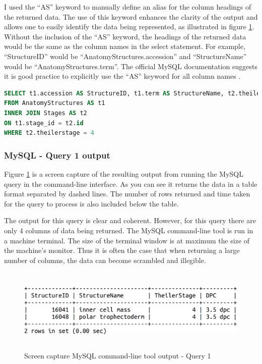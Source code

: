 I used the ``AS'' keyword to manually define an alias for the column headings of the returned data. The use of this keyword enhances the clarity of the output and allows one to easily identify the data being represented, as illustrated in figure \ref{fig:mysqlquery1}. Without the inclusion of the ``AS'' keyword, the headings of the returned data would be the same as the column names in the select statement. For example, ``StructureID'' would be ``AnatomyStructures.accession'' and ``StructureName'' would be ``AnatomyStructures.term''. The official MySQL documentation suggests it is good practice to explicitly use the ``AS'' keyword for all column names \cite{mysqlworkbench}.

\begin{lstlisting}[language=SQL, caption=MySQL query 1 statement. All structures at Theiler Stage X., label=code:mysqlquery1]
SELECT t1.accession AS StructureID, t1.term AS StructureName, t2.theilerstage AS TheilerStage, t2.dpc AS DPC
FROM AnatomyStructures AS t1
INNER JOIN Stages AS t2
ON t1.stage_id = t2.id
WHERE t2.theilerstage = 4
\end{lstlisting}

\subsubsection*{MySQL - Query 1 output}\label{mysqlquery1output}
Figure \ref{fig:mysqlquery1} is a screen capture of the resulting output from running the MySQL query in the command-line interface. As you can see it returns the data in a table format separated by dashed lines. The number of rows returned and time taken for the query to process is also included below the table.

The output for this query is clear and coherent. However, for this query there are only 4 columns of data being returned. The MySQL command-line tool is run in a machine terminal. The size of the terminal window is at maximum the size of the machine's monitor. Thus it is often the case that when returning a large number of columns, the data can become scrambled and illegible.

\begin{figure}[H]\begin{center}\includegraphics[height=4cm,width=0.9\linewidth]{images/mysqlquery1}\caption{Screen capture MySQL command-line tool output - Query 1}\label{fig:mysqlquery1}\end{center}\end{figure}

